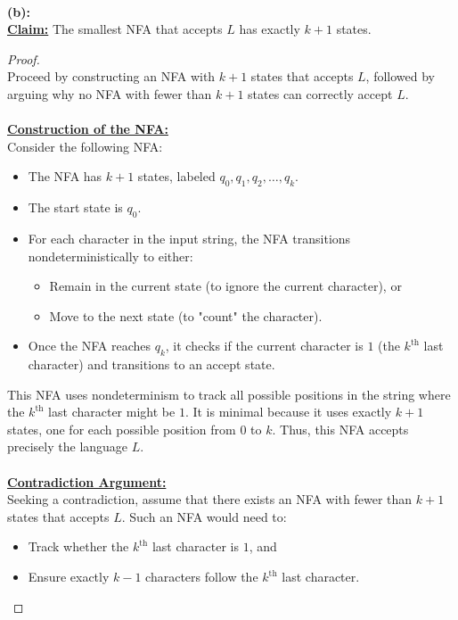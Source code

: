\documentclass[12pt]{article}
\begin{document}
\leavevmode\\
\textbf{(b):} \\
\textbf{\underline{Claim:}} The smallest NFA that accepts $L$ has exactly $k + 1$ states.
\begin{proof}
\leavevmode\\
    Proceed by constructing an NFA with $k + 1$ states that accepts $L$, followed by arguing why no NFA with fewer than $k + 1$ states can correctly accept $L$. \\
    \\
    \underline{\textbf{Construction of the NFA:}} \\
    Consider the following NFA:
    \begin{itemize}
        \item The NFA has $k + 1$ states, labeled $q_0, q_1, q_2, \dots, q_k$.
        \item The start state is $q_0$.
        \item For each character in the input string, the NFA transitions nondeterministically to either:
        \begin{itemize}
            \item Remain in the current state (to ignore the current character), or
            \item Move to the next state (to "count" the character).
        \end{itemize}
        \item Once the NFA reaches $q_k$, it checks if the current character is $1$ (the $k^\text{th}$ last character) and transitions to an accept state.
    \end{itemize}
    This NFA uses nondeterminism to track all possible positions in the string where the $k^\text{th}$ last character might be $1$. It is minimal because it uses exactly $k + 1$ states, one for each possible position from $0$ to $k$. Thus, this NFA accepts precisely the language $L$. \\
    \\
    \underline{\textbf{Contradiction Argument:}} \\
    Seeking a contradiction, assume that there exists an NFA with fewer than $k + 1$ states that accepts $L$. Such an NFA would need to:
    \begin{itemize}
        \item Track whether the $k^\text{th}$ last character is $1$, and
        \item Ensure exactly $k - 1$ characters follow the $k^\text{th}$ last character.

\end{itemize}
\end{proof}
\end{document}
